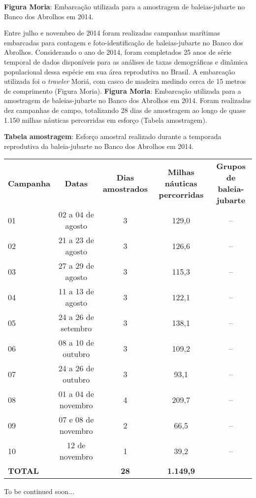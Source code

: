 \textbf{Figura Moria}: Embarcação utilizada para a amostragem de baleias-jubarte no Banco dos Abrolhos em 2014.

Entre julho e novembro de 2014 foram realizadas campanhas marítimas embarcadas para contagem e foto-identificação de baleias-jubarte no Banco dos Abrolhos. Considerando o ano de 2014, foram completados 25 anos de série temporal de dados disponíveis para as análises de taxas demográficas e dinâmica populacional dessa espécie em sua área reprodutiva no Brasil. A embarcação utilizada foi o \textit{trawler} Moriá, com casco de madeira medindo cerca de 15 metros de comprimento (Figura Moria).  \textbf{Figura Moria}: Embarcação utilizada para a amostragem de baleias-jubarte no Banco dos Abrolhos em 2014.   Foram realizadas dez campanhas de campo, totalizando 28 dias de amostragem ao longo de quase 1.150 milhas náuticas percorridas em esforço (Tabela amostragem).  

\textbf{Tabela amostragem}: Esforço amostral realizado durante a temporada reprodutiva da baleia-jubarte no Banco dos Abrolhos em 2014.  

\begin{tabular}{lcccc}  
\textbf{Campanha} & \textbf{Datas} & \textbf{Dias amostrados} & \textbf{Milhas náuticas percorridas} & \textbf{Grupos de baleia-jubarte} \\
01 & 02 a 04 de agosto & 3 & 129,0 & -- \\
02 & 21 a 23 de agosto & 3 & 126,6 & -- \\
03 & 27 a 29 de agosto & 3 & 115,3 & -- \\
04 & 11 a 13 de agosto & 3 & 122,1 & -- \\
05 & 24 a 26 de setembro & 3 & 138,1 & -- \\
06 & 08 a 10 de outubro & 3 & 109,2 & -- \\
07 & 24 a 26 de outubro & 3 & 93,1 & -- \\
08 & 01 a 04 de novembro & 4 & 209,7 & -- \\
09 & 07 e 08 de novembro & 2 & 66,5 & -- \\
10 & 12 de novembro & 1 & 39,2 & -- \\
\textbf{TOTAL} & & \textbf{28} & \textbf{1.149,9} & \\
\end{tabular}    

To be continued soon... 